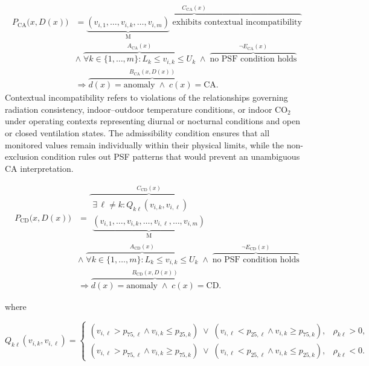 \documentclass[preprint,12pt]{elsarticle}
\begin{document}
\begingroup
\scriptsize
\begin{equation}
\begin{aligned}
P_{\mathrm{CA}}\bigl(x,D(x)\bigr)
&=
\overbrace{
    \underbrace{
    (v_{i,1},\ldots,v_{i,k},\ldots,v_{i,m})
    }_{\mathrm{M}}
    \text{ exhibits contextual incompatibility}
}^{C_{\mathrm{CA}}(x)}
\\[1mm]
&\land\;
\overbrace{
 \forall k\in\{1,\ldots,m\}:
L_k\leq v_{i,k}\leq U_k
}^{A_{\mathrm{CA}}(x)}
\;\land\;
\overbrace{
    \text{no PSF condition holds}
}^{\neg E_{\mathrm{CA}}(x)}
\\[1mm]
&\Rightarrow
\overbrace{
    d(x)=\mathrm{anomaly}
    \;\land\;
    c(x)=\mathrm{CA}
}^{B_{\mathrm{CA}}(x,D(x))}.
\end{aligned}
\label{eq:property_ca}
\end{equation}
\endgroup
Contextual incompatibility refers to violations of the relationships
governing radiation consistency, indoor--outdoor temperature conditions,
or indoor CO$_2$ under operating contexts representing diurnal or nocturnal
conditions and open or closed ventilation states. The admissibility condition
ensures that all monitored values remain individually within their physical
limits, while the non-exclusion condition rules out PSF patterns that would
prevent an unambiguous CA interpretation.

\begingroup
\scriptsize
\begin{equation}
\begin{aligned}
P_{\mathrm{CD}}\bigl(x,D(x)\bigr)
&=
\overbrace{
    \substack{
    \exists\,\ell\neq k:
    Q_{k\ell}(v_{i,k},v_{i,\ell})
    \\[1mm]
    \underbrace{
    (v_{i,1},\ldots,v_{i,k},\ldots,v_{i,\ell},\ldots,v_{i,m})
    }_{\mathrm{M}}
    }
}^{C_{\mathrm{CD}}(x)}
\\[1mm]
&\land\;
\overbrace{
\forall k\in\{1,\ldots,m\}:
L_k\leq v_{i,k}\leq U_k
}^{A_{\mathrm{CD}}(x)}
\;\land\;
\overbrace{
    \text{no PSF condition holds}
}^{\neg E_{\mathrm{CD}}(x)}
\\[1mm]
&\Rightarrow
\overbrace{
    d(x)=\mathrm{anomaly}
    \;\land\;
    c(x)=\mathrm{CD}
}^{B_{\mathrm{CD}}(x,D(x))}.
\end{aligned}
\label{eq:property_cd}
\end{equation}
\endgroup

where

\begingroup
\scriptsize
\begin{equation}
Q_{k\ell}(v_{i,k},v_{i,\ell})=
\begin{cases}
(v_{i,\ell}>p_{75,\ell}\land v_{i,k}\leq p_{25,k})
\;\lor\;
(v_{i,\ell}<p_{25,\ell}\land v_{i,k}\geq p_{75,k}),
& \rho_{k\ell}>0,\\[1mm]
(v_{i,\ell}>p_{75,\ell}\land v_{i,k}\geq p_{75,k})
\;\lor\;
(v_{i,\ell}<p_{25,\ell}\land v_{i,k}\leq p_{25,k}),
& \rho_{k\ell}<0.
\end{cases}
\label{eq:cd_incompatibility}
\end{equation}
\endgroup
\end{document}
